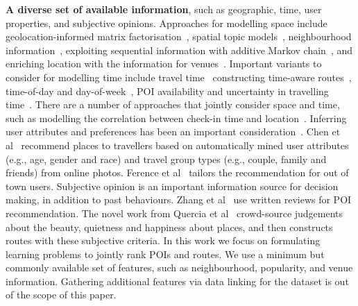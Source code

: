 {\bf A diverse set of available information},
such as geographic, time, user properties, and subjective opinions.
Approaches for modelling space include geolocation-informed matrix factorisation~\cite{lian2014geomf}, spatial topic models~\cite{hu2013spatialtopic}, neighbourhood information~\cite{liu2014exploiting}, exploiting sequential information with additive Markov chain~\cite{zhang2014lore}, and enriching location with the information for venues~\cite{deveaud2014importance,deveaud2015experiments}.
Important variants to consider for modelling time include travel time~\cite{gao2013temporal}
constructing time-aware routes~\cite{yuan2013timeaware,hsieh2014mining}, time-of-day and day-of-week~\cite{chen2015tripplanner}, POI availability and uncertainty in travelling time~\cite{zhang2015personalized}. There are a number of approaches that jointly consider space and time\cite{yuan2014graph,zhang2015location}, such as modelling the correlation between check-in time and location~\cite{gao2013temporal}.
Inferring user attributes and preferences has been an important consideration~\cite{liu2013personalized}.
Chen et al~\cite{chen2013people} recommend places to travellers based on automatically mined user attributes
(e.g., age, gender and race) and travel group types (e.g., couple, family and friends) from online photos.
Ference et al~\cite{ference2013location} tailors the recommendation for out of town users.
Subjective opinion is an important information source for decision making, in addition to past behaviours. Zhang et al~\cite{Zhang2015OOP} use written reviews for POI recommendation.
The novel work from Quercia et al~\cite{ht14} crowd-source judgements about the beauty, quietness and happiness about places, and then constructs routes with these subjective criteria.
In this work we focus on formulating learning problems to jointly rank POIs and routes. We use a minimum but commonly available set of features, such as neighbourhood, popularity, and venue information. Gathering additional features via data linking for the dataset is out of the scope of this paper.

